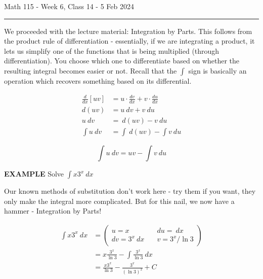 \documentclass{article}
\begin{document}
Math 115 - Week 6, Class 14 - 5 Feb 2024
\hrule


\vspace{10pt}

We proceeded with the lecture material: Integration by Parts. This follows from the product rule of differentiation - essentially, if we are integrating a product, it lets us simplify one of the functions that is being multiplied (through differentiation). You choose which one to differentiate based on whether the resulting integral becomes easier or not. Recall that the $\int$ sign is basically an operation which recovers something based on its differential.

\begin{align*}
\frac{d}{dx}[uv]&=u\cdot\frac{dv}{dx}+v\cdot\frac{du}{dx}\\
d(uv)&=u\ dv+v\ du\\
u\ dv&=\ d(uv)-v\ du\\
\int u\ dv&=\int\ d(uv)-\int v\ du
\end{align*}

\begin{equation}
\int u\ dv=uv-\int v\ du
\end{equation}

\vspace{10pt}

{\bf{}EXAMPLE} Solve $\displaystyle\int x3^x\ dx$

\vspace{10pt}

Our known methods of substitution don't work here - try them if you want, they only make the integral more complicated. But for this nail, we now have a hammer - Integration by Parts!

\begin{align*}
\int x3^x\ dx&=\left(\begin{aligned}u=x&\quad du=\ dx\\dv=3^x\ dx&\quad v=3^x/\ln3\end{aligned}\right)\\
&=x\frac{3^x}{\ln3}-\int\frac{3^x}{\ln3}\ dx\\
&=\frac{x3^x}{\ln3}-\frac{3^x}{(\ln3)^2}+C
\end{align*}

\begin{center}
\end{center}
\end{document}
